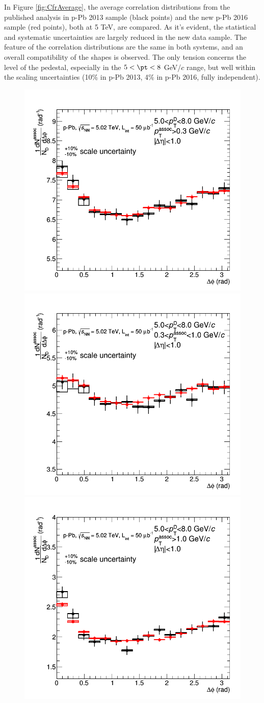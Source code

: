In Figure \ref{fig:CfrAverage}, the average correlation distributions from the published analysis in p-Pb 2013 sample (black points) and the new p-Pb 2016 sample (red points), both at 5 TeV, are compared. As it's evident, the statistical and systematic uncertainties are largely reduced in the new data sample. The feature of the correlation distributions are the same in both systems, and an overall compatibility of the shapes is observed. The only tension concerns the level of the pedestal, especially in the $5 < \pt < 8$ GeV/$c$ range, but well within the scaling uncertainties (10\% in p-Pb 2013, 4\% in p-Pb 2016, fully independent).

\begin{figure}[!htbp]
\centering
\centering
{\includegraphics[width=0.47\linewidth]{figures/Cfr2013vs2016/Average_Cfr_2013_2016_Pt5to8_Thr03to99.png}}
{\includegraphics[width=0.47\linewidth]{figures/Cfr2013vs2016/Average_Cfr_2013_2016_Pt5to8_Thr03to1.png}}
{\includegraphics[width=0.47\linewidth]{figures/Cfr2013vs2016/Average_Cfr_2013_2016_Pt5to8_Thr1to99.png}}

\end{figure}
